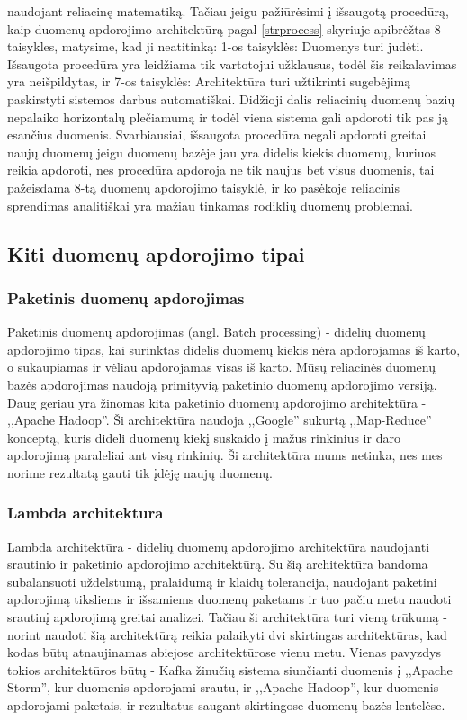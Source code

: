 \documentclass{VUMIFPSkursinis}
\begin{document}
    naudojant reliacinę matematiką. Tačiau jeigu pažiūrėsimi į išsaugotą procedūrą, kaip duomenų apdorojimo architektūrą pagal \ref{strprocess} skyriuje apibrėžtas 8 taisykles, 
    matysime, kad ji neatitinką: 1-os taisyklės: Duomenys turi judėti. Išsaugota procedūra yra leidžiama tik vartotojui užklausus, todėl šis reikalavimas yra neišpildytas, 
    ir 7-os taisyklės: Architektūra turi užtikrinti sugebėjimą paskirstyti sistemos darbus automatiškai. Didžioji dalis reliacinių duomenų bazių nepalaiko horizontalų 
    plečiamumą\cite{cattelsql, jkubas} ir todėl viena sistema gali apdoroti tik pas ją esančius duomenis. Svarbiausiai, išsaugota procedūra negali apdoroti greitai naujų duomenų jeigu duomenų bazėje 
    jau yra didelis kiekis duomenų, kuriuos reikia apdoroti, nes procedūra apdoroja ne tik naujus bet visus duomenis, tai pažeisdama 8-tą duomenų apdorojimo taisyklė,
    ir ko pasėkoje reliacinis sprendimas analitiškai yra mažiau tinkamas rodiklių duomenų problemai.

\subsection{Kiti duomenų apdorojimo tipai}

\subsubsection{Paketinis duomenų apdorojimas}

Paketinis duomenų apdorojimas (angl. Batch processing) - didelių duomenų apdorojimo tipas, kai surinktas didelis duomenų kiekis nėra apdorojamas iš karto, o sukaupiamas ir vėliau apdorojamas visas iš karto. 
Mūsų reliacinės duomenų bazės apdorojimas naudoją primityvią paketinio duomenų apdorojimo versiją. Daug geriau yra žinomas kita paketinio duomenų apdorojimo architektūra - ,,Apache Hadoop''. Ši architektūra
naudoja ,,Google'' sukurtą ,,Map-Reduce'' konceptą\cite{dean2008mapreduce}, kuris dideli duomenų kiekį suskaido į mažus rinkinius ir daro apdorojimą paraleliai ant visų rinkinių.\cite{batchProcessing} Ši architektūra mums netinka, nes mes norime rezultatą 
gauti tik įdėję naujų duomenų.

\subsubsection{Lambda architektūra}

Lambda architektūra - didelių duomenų apdorojimo architektūra naudojanti srautinio ir paketinio apdorojimo architektūrą. Su šią architektūra bandoma subalansuoti uždelstumą, pralaidumą ir klaidų tolerancija, naudojant 
paketini apdorojimą tiksliems ir išsamiems duomenų paketams ir tuo pačiu metu naudoti srautinį apdorojimą greitai analizei\cite{hasani2014lambda}. Tačiau ši architektūra turi vieną trūkumą - norint naudoti šią architektūrą
reikia palaikyti dvi skirtingas architektūras, kad kodas būtų atnaujinamas abiejose architektūrose vienu metu\cite{kreps2014questioning}. Vienas pavyzdys tokios architektūros būtų - Kafka žinučių sistema siunčianti duomenis į ,,Apache Storm'', 
kur duomenis apdorojami srautu, ir ,,Apache Hadoop'', kur duomenis apdorojami paketais, ir rezultatus saugant skirtingose duomenų bazės lentelėse.
\end{document}
